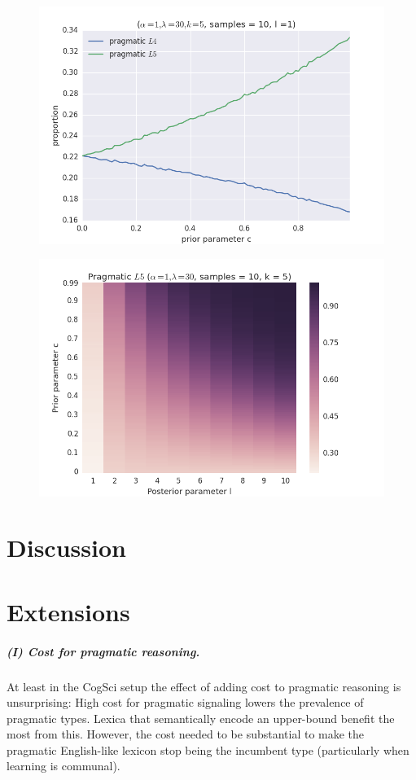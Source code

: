 \documentclass[a4paper]{article}
\begin{document}
\begin{figure}
\includegraphics[width=\linewidth,height=\textheight,keepaspectratio]{../presentations/03cost-with-l1}
\end{figure}

\begin{figure}
\includegraphics[width=\linewidth,height=\textheight,keepaspectratio]{../presentations/01heatmap}
\end{figure}

\section{Discussion}

\section{Extensions}
\subparagraph{(I) Cost for pragmatic reasoning.} At least in the CogSci setup the effect of adding cost to pragmatic reasoning is unsurprising: High cost for pragmatic signaling lowers the prevalence of pragmatic types. Lexica that semantically encode an upper-bound benefit the most from this. However, the cost needed to be substantial to make the pragmatic English-like lexicon stop being the incumbent type (particularly when learning is communal). 
\end{document}
